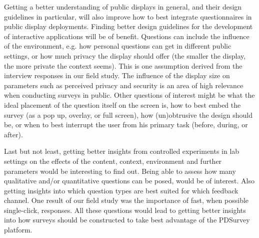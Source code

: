 Getting a better understanding of public displays in general, and their design guidelines in particular, will also improve how to best integrate questionnaires in public display deployments. Finding better design guidelines for the development of interactive applications will be of benefit. Questions can include the influence of the environment, e.g. how personal questions can get in different public settings, or how much privacy the display should offer (the smaller the display, the more private the context seems). This is one assumption derived from the interview responses in our field study. The influence of the display size on parameters such as perceived privacy and security is an area of high relevance when conducting surveys in public.
Other questions of interest might be what the ideal placement of the question itself on the screen is, how to best embed the survey (as a pop up, overlay, or full screen), how (un)obtrusive the design should be, or when to best interrupt the user from his primary task (before, during, or after).





Last but not least, getting better insights from controlled experiments in lab settings on the effects of the content, context, environment and further parameters would be interesting to find out. Being able to assess how many qualitative and/or quantitative questions can be posed, would be of interest. Also getting insights into which question types are best suited for which feedback channel. One result of our field study was the importance of fast, when possible single-click, responses.
All these questions would lead to getting better insights into how surveys should be constructed to take best advantage of the PDSurvey platform.







